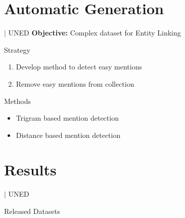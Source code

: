 \documentclass[]{beamer}
\def\mAlertSpace{\vspace{0.5em}}
\newcommand{\mShortTitle}{\secname \hfill {\scriptsize$|$ UNED}}
\begin{document}
\section{Automatic Generation}
  \begin{frame}{\mShortTitle}
    \textcolor{mLightBrown}{\textbf{Objective:}} Complex dataset for Entity Linking
    \begin{alertblock}{Strategy}
      \begin{enumerate}
        \item Develop method to detect easy mentions
        \item Remove easy mentions from collection
      \end{enumerate}
    \end{alertblock}
    \begin{alertblock}{Methods}
      \begin{itemize}
        \item Trigram based mention detection
        \item Distance based mention detection
      \end{itemize}
    \end{alertblock}
  \end{frame}

\section{Results}
  \begin{frame}{\mShortTitle}
    \mAlertSpace
    \begin{alertblock}{Released Datasets}
      
    \end{alertblock}
  \end{frame}
\end{document}
